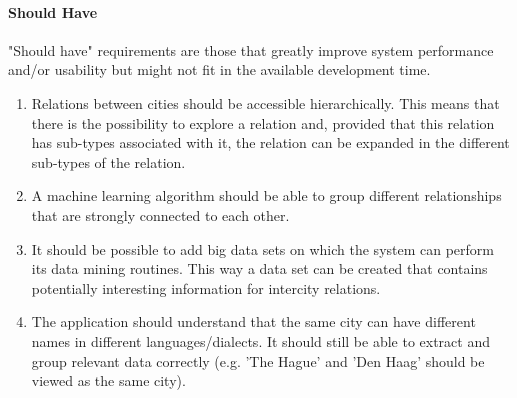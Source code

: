 \paragraph{Should Have}
"Should have" requirements are those that greatly improve system performance and/or usability but might not fit in the available development time.

\begin{enumerate}
    \item Relations between cities should be accessible hierarchically. This means that there is the possibility to explore a relation and, provided that this relation has sub-types associated with it, the relation can be expanded in the different sub-types of the relation.
    \item A machine learning algorithm should be able to group different relationships that are strongly connected to each other.
    \item It should be possible to add big data sets on which the system can perform its data mining routines. This way a data set can be created that contains potentially interesting information for intercity relations.
    \item The application should understand that the same city can have different names in different languages/dialects. It should still be able to extract and group relevant data correctly (e.g. 'The Hague' and 'Den Haag' should be viewed as the same city).
\end{enumerate}
\iffalse

